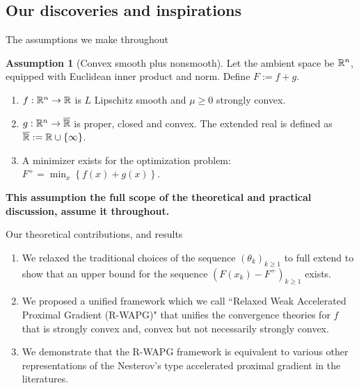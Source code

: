 \documentclass[11pt]{beamer}
\theoremstyle{definition}
\newtheorem{assumption}{Assumption}[section]
\begin{document}
    \subsection{Our discoveries and inspirations}
        \begin{frame}{The assumptions we make throughout}
            \begin{assumption}[Convex smooth plus nonsmooth]
                Let the ambient space be $\mathbb R^n$, equipped with Euclidean inner product and norm. 
                Define $F := f + g$.
                \begin{enumerate}
                    \item $f: \mathbb R^n \rightarrow \mathbb R$ is $L$ Lipschitz smooth and $\mu \ge 0$ strongly convex.
                    \item $g: \mathbb R^n \rightarrow \overline {\mathbb R}$ is proper, closed and convex. The extended real is defined as $\overline {\mathbb R} := \mathbb R \cup \{\infty\}$.
                    \item A minimizer exists for the optimization problem: $F^+ = \min_x \left\lbrace f(x) + g(x)\right\rbrace$.
                \end{enumerate}
            \end{assumption}
            \textbf{This assumption the full scope of the theoretical and practical discussion, assume it throughout.}
        \end{frame}
        \begin{frame}{Our theoretical contributions, and results}
            \begin{enumerate}
                \item We relaxed the traditional choices of the sequence $(\theta_k)_{k \ge 1}$ to full extend to show that an upper bound for the sequence $(F(x_k) - F^+)_{k \ge 1}$ exists. 
                \item We proposed a unified framework which we call ``Relaxed Weak Accelerated Proximal Gradient (R-WAPG)" that unifies the convergence theories for $f$ that is strongly convex and, convex but not necessarily strongly convex. 
                \item We demonstrate that the R-WAPG framework is equivalent to various other representations of the Nesterov's type accelerated proximal gradient in the literatures. 
            \end{enumerate}
        \end{frame}
\end{document}
